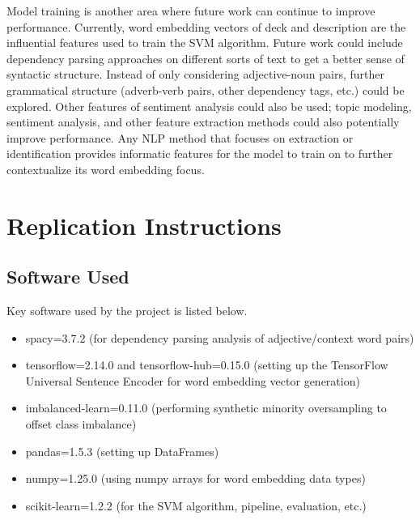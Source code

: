\documentclass[10pt,twocolumn]{article}
\begin{document}
Model training is another area where future work can continue to improve performance. Currently, word embedding vectors of deck and description are the influential features used to train the SVM algorithm. Future work could include dependency parsing approaches on different sorts of text to get a better sense of syntactic structure. \cite{LDiCaro} Instead of only considering adjective-noun pairs, further grammatical structure (adverb-verb pairs, other dependency tags, etc.) could be explored. Other features of sentiment analysis could also be used; topic modeling, sentiment analysis, and other feature extraction methods could also potentially improve performance. \cite{Ramzan, Ryan_51} Any NLP method that focuses on extraction or identification provides informatic features for the model to train on to further contextualize its word embedding focus.





\appendix

\section{Replication Instructions}

\subsection{Software Used}
Key software used by the project is listed below.

\begin{itemize}
\item spacy=3.7.2 (for dependency parsing analysis of adjective/context word pairs)
\item tensorflow=2.14.0 and tensorflow-hub=0.15.0 (setting up the TensorFlow Universal Sentence Encoder for word embedding vector generation)
\item imbalanced-learn=0.11.0 (performing synthetic minority oversampling to offset class imbalance)
\item pandas=1.5.3 (setting up DataFrames)
\item numpy=1.25.0 (using numpy arrays for word embedding data types)
\item scikit-learn=1.2.2 (for the SVM algorithm, pipeline, evaluation, etc.)
\end{itemize}
\end{document}
